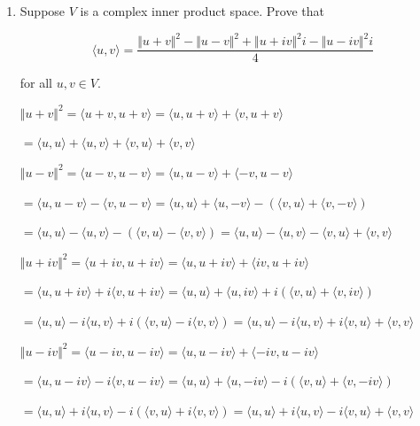 \documentclass[fleqn]{article}
\makeatletter
\newenvironment{equationCenter}{\@fleqnfalse\begin{equation*}}{\end{equation*}}
\makeatother
\begin{document}
\begin{enumerate}[nolistsep]
			\item Suppose $V$ is a complex inner product space. Prove that
			
				\begin{equationCenter}
					\langle u, v \rangle = \frac{{\Vert u + v \Vert}^2 - {\Vert u - v \Vert}^2 + {\Vert u + iv \Vert}^2i - {\Vert u - iv \Vert}^2i}{4}
				\end{equationCenter}
				
				for all $u, v \in V$.
				
				${\Vert u + v \Vert}^2 = \langle u + v, u + v \rangle = \langle u, u + v \rangle + \langle v, u + v \rangle$
				
				$ = \langle u, u \rangle + \langle u, v \rangle + \langle v, u \rangle + \langle v, v \rangle$
				
				${\Vert u - v \Vert}^2 = \langle u - v, u - v \rangle = \langle u, u - v \rangle + \langle -v, u - v \rangle$
				
				$ = \langle u, u - v \rangle - \langle v, u - v \rangle = \langle u, u \rangle + \langle u, - v \rangle - (\langle v, u \rangle + \langle v, -v \rangle)$
				
				$ = \langle u, u \rangle - \langle u, v \rangle - (\langle v, u \rangle - \langle v, v \rangle) = \langle u, u \rangle - \langle u, v \rangle - \langle v, u \rangle + \langle v, v \rangle$
				
				${\Vert u + iv \Vert}^2 = \langle u + iv, u + iv \rangle = \langle u, u + iv \rangle + \langle iv, u + iv \rangle$
				
				$ = \langle u, u + iv \rangle + i\langle v, u + iv \rangle = \langle u, u \rangle + \langle u, iv \rangle + i(\langle v, u \rangle + \langle v, iv \rangle)$
				
				$ = \langle u, u \rangle - i\langle u, v \rangle + i(\langle v, u \rangle - i\langle v, v \rangle) = \langle u, u \rangle - i\langle u, v \rangle + i\langle v, u \rangle + \langle v, v \rangle$
				
				${\Vert u - iv \Vert}^2 = \langle u - iv, u - iv \rangle = \langle u, u - iv \rangle + \langle -iv, u - iv \rangle$
				
				$ = \langle u, u - iv \rangle - i\langle v, u - iv \rangle = \langle u, u \rangle + \langle u, -iv \rangle - i(\langle v, u \rangle + \langle v, -iv \rangle)$
				
				$ = \langle u, u \rangle + i\langle u, v \rangle - i(\langle v, u \rangle + i\langle v, v \rangle) = \langle u, u \rangle + i\langle u, v \rangle - i\langle v, u \rangle + \langle v, v \rangle$
				

\end{enumerate}
\end{document}
